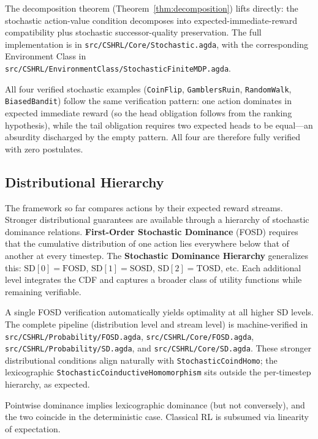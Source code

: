 \documentclass[runningheads]{llncs}
\newcommand{\fpath}[1]{\nolinkurl{#1}}
\begin{document}
The decomposition theorem (Theorem~\ref{thm:decomposition}) lifts directly: the stochastic action-value condition decomposes into expected-immediate-reward compatibility plus stochastic successor-quality preservation. The full implementation is in \fpath{src/CSHRL/Core/Stochastic.agda}, with the corresponding Environment Class in \fpath{src/CSHRL/EnvironmentClass/StochasticFiniteMDP.agda}.

All four verified stochastic examples (\texttt{CoinFlip}, \texttt{GamblersRuin}, \texttt{RandomWalk}, \texttt{BiasedBandit}) follow the same verification pattern: one action dominates in expected immediate reward (so the head obligation follows from the ranking hypothesis), while the tail obligation requires two expected heads to be equal---an absurdity discharged by the empty pattern. All four are therefore fully verified with zero postulates.

\subsection{Distributional Hierarchy}

The framework so far compares actions by their expected reward streams. Stronger distributional guarantees are available through a hierarchy of stochastic dominance relations. \textbf{First-Order Stochastic Dominance} (FOSD) requires that the cumulative distribution of one action lies everywhere below that of another at every timestep. The \textbf{Stochastic Dominance Hierarchy} generalizes this: $\text{SD}[0] = \text{FOSD}$, $\text{SD}[1] = \text{SOSD}$, $\text{SD}[2] = \text{TOSD}$, etc. Each additional level integrates the CDF and captures a broader class of utility functions while remaining verifiable.

A single FOSD verification automatically yields optimality at all higher SD levels. The complete pipeline (distribution level and stream level) is machine-verified in \fpath{src/CSHRL/Probability/FOSD.agda}, \fpath{src/CSHRL/Core/FOSD.agda}, \fpath{src/CSHRL/Probability/SD.agda}, and \fpath{src/CSHRL/Core/SD.agda}. These stronger distributional conditions align naturally with \texttt{StochasticCoindHomo}; the lexicographic \texttt{StochasticCoinductiveHomomorphism} sits outside the per-timestep hierarchy, as expected.

Pointwise dominance implies lexicographic dominance (but not conversely), and the two coincide in the deterministic case. Classical RL is subsumed via linearity of expectation.
\end{document}
